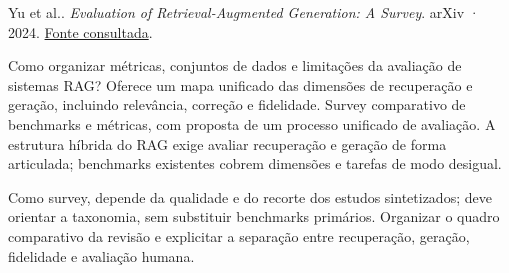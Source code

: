 {\small Yu et al.. \textit{Evaluation of Retrieval-Augmented Generation: A Survey}. arXiv · 2024. \href{https://arxiv.org/abs/2405.07437}{Fonte consultada}.\par}
Como organizar métricas, conjuntos de dados e limitações da avaliação de sistemas RAG?
Oferece um mapa unificado das dimensões de recuperação e geração, incluindo relevância, correção e fidelidade.
Survey comparativo de benchmarks e métricas, com proposta de um processo unificado de avaliação.
A estrutura híbrida do RAG exige avaliar recuperação e geração de forma articulada; benchmarks existentes cobrem dimensões e tarefas de modo desigual.
\begin{itemize}
\end{itemize}
Como survey, depende da qualidade e do recorte dos estudos sintetizados; deve orientar a taxonomia, sem substituir benchmarks primários.
Organizar o quadro comparativo da revisão e explicitar a separação entre recuperação, geração, fidelidade e avaliação humana.
\clearpage
